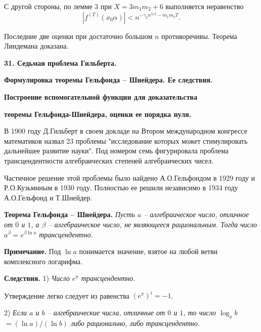 С другой стороны, по лемме 3 при $X=3m_1m_2+6$ выполняется
неравенство
$$
|f^{(T)}(x_0\alpha)| <n^{-\gamma_2n^{3/2}-m_1m_2T}.
$$

Последние две оценки при достаточно большом $n$ противоречивы.
Теорема Линдемана  доказана.


\break

 \vskip 5mm \centerline{\bf {31. Седьмая
проблема Гильберта.}} \centerline{\bf
{Формулировка теоремы Гельфонда -- Шнейдера. Ее
следствия.}}

\centerline{\bf { Построение вспомогательной
функции для доказательства}} \centerline{\bf
{теоремы Гельфонда-Шнейдера, оценки ее порядка
нуля.}} \vskip 5mm

В 1900 году Д.Гильберт в своем докладе на Втором международном
конгрессе математиков назвал 23 проблемы "исследование которых
может стимулировать дальнейшее развитие науки". Под номером семь
фигурировала проблема трансцендентности алгебраических степеней
алгебраических чисел.

Частичное решение этой проблемы было найдено А.О.Гельфондом в 1929
году и Р.О.Кузьминым в 1930 году. Полностью ее решили независимо в
1934 году А.О.Гельфонд и Т.Шнейдер.



%


\vskip 5mm



{\bf Теорема Гельфонда -- Шнейдера.} {\it Пусть
$a$ -- алгебраическое число, отличное от $0$  и
$1$, а $\beta$   -- алгебраическое число, не
являющееся рациональным.  Тогда число
$a^{\beta}=e^{\beta\ln a}$ трансцендентно.}
\vskip 3mm


{\bf Примечание.} Под $\ln a$ понимается
значение, взятое на любой ветви комплексного
логарифма.\vskip 3mm


{\bf Следствия.} 1)  {\it  Число $e^{\pi}$
трансцендентно.}\vskip 3mm


 Утверждение легко следует из равенства
$(e^{\pi})^i=-1$. \vskip 3mm

 2) {\it Если $a$  и $b$ -- алгебраические числа,
отличные  от $0$  и $1$, то число $\log_ab$
$=(\ln a)/(\ln b)$ либо рационально, либо
трансцендентно.}\vskip 3mm


